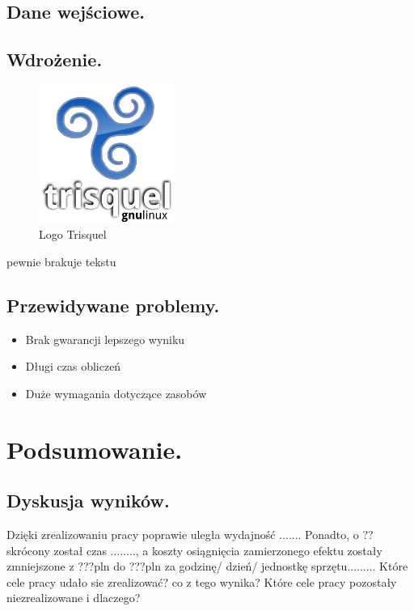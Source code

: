 \documentclass[twoside,12pt]{report}
\begin{document}
\section{Dane wejściowe.}





\section{Wdrożenie.}

\begin{figure}[ht]
\includegraphics[width=0.4\textwidth]{img/trisquel}
\caption{Logo Trisquel\cite{trisquel}}
\end{figure}

pewnie brakuje tekstu

\section{Przewidywane problemy.}

\begin{itemize}
\item Brak gwarancji lepszego wyniku
\item Długi czas obliczeń
\item Duże wymagania dotyczące zasobów
\end{itemize}


\chapter{Podsumowanie.}
\section{Dyskusja wyników.}
Dzięki zrealizowaniu pracy poprawie uległa wydajność ....... Ponadto, o ??
skrócony został czas ........, a koszty osiągnięcia zamierzonego efektu zostały
zmniejszone z ???pln do ???pln za godzinę/ dzień/ jednostkę sprzętu.........
\indent Które cele pracy udało sie zrealizować? co z tego wynika? Które cele
pracy pozostały niezrealizowane i dlaczego? 
\end{document}
